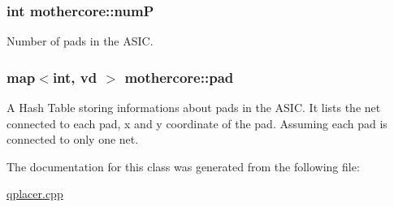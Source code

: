 \subsubsection[{numP}]{\setlength{\rightskip}{0pt plus 5cm}int mothercore\+::numP\hspace{0.3cm}{\ttfamily [private]}}\hypertarget{classmothercore_a2267ccb4d62638cb401e86b612a7b88a}{}\label{classmothercore_a2267ccb4d62638cb401e86b612a7b88a}
Number of pads in the A\+S\+IC. 
\subsubsection[{pad}]{\setlength{\rightskip}{0pt plus 5cm}map$<$int, {\bf vd} $>$ mothercore\+::pad\hspace{0.3cm}{\ttfamily [private]}}\hypertarget{classmothercore_aa99289e91a4a78b1edc271498a68f88b}{}\label{classmothercore_aa99289e91a4a78b1edc271498a68f88b}
A Hash Table storing informations about pads in the A\+S\+IC. It lists the net connected to each pad, x and y coordinate of the pad. Assuming each pad is connected to only one net. 

The documentation for this class was generated from the following file\+:\begin{DoxyCompactItemize}
\item 
\hyperlink{qplacer_8cpp}{qplacer.\+cpp}\end{DoxyCompactItemize}
